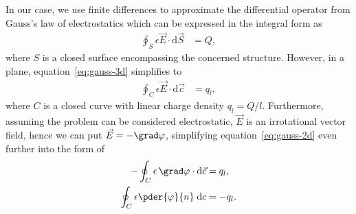 \documentclass[11pt,a4paper]{article}
\begin{document}
In our case, we use finite differences to approximate the differential operator from Gauss's law of electrostatics which can be expressed in the integral form as
\begin{align}
    \label{eq:gauss-3d}
    \oint_S \epsilon \vec E \cdot \mathrm d \vec S &= Q,
\end{align}
where $S$ is a closed surface encompassing the concerned structure. However, in a plane, equation~\ref{eq:gauss-3d} simplifies to
\begin{align}
    \label{eq:gauss-2d}
    \oint_C \epsilon \vec E \cdot \mathrm d \vec c &= q_l,
\end{align}
where $C$ is a closed curve with linear charge density $q_l = Q/l$. Furthermore, assuming the problem can be considered electrostatic, $\vec E$ is an irrotational vector field, hence we can put $\vec E = -\grad \varphi$, simplifying equation~\ref{eq:gauss-2d} even further into the form of
\begin{align}
    \nonumber
    -\oint_C \epsilon \, \grad \varphi \cdot \mathrm d \vec c &= q_l,
\\
    \label{eq:gauss-final}
    \oint_C \epsilon \pder{\varphi}{n} \; \mathrm d c &= -q_l.
\end{align}
\end{document}
